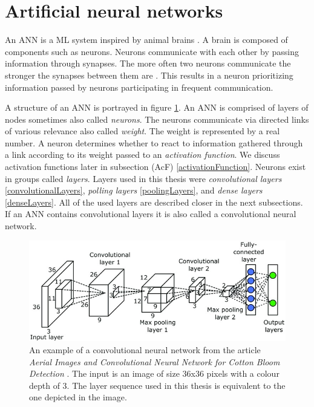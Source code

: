 \section{Artificial neural networks} \label{artificialNeuralNetworks}
An ANN is a ML system inspired by animal brains \cite{machineLeraningApproaches}. A brain is composed of components such as neurons. Neurons communicate with each other by passing information through synapses. The more often two neurons communicate the stronger the synapses between them are \cite{neuronsInBrain}. This results in a neuron prioritizing information passed by neurons participating in frequent communication. 

A structure of an ANN is portrayed in figure \ref{structureOfCNN}. An ANN is comprised of layers of nodes sometimes also called \textit{neurons}. The neurons communicate via directed links of various relevance also called \textit{weight}. The weight is represented by a real number. A neuron determines whether to react to information gathered through a link according to its weight passed to an \textit{activation function}. We discuss activation functions later in subsection (AcF) \ref{activationFunction}. Neurons exist in groups called \textit{layers}. Layers used in this thesis were \textit{convolutional layers} \ref{convolutionalLayers}, \textit{polling layers} \ref{poolingLayers}, and \textit{dense layers} \ref{denseLayers}. All of the used layers are described closer in the next subsections. If an ANN contains convolutional layers it is also called a convolutional neural network.
\begin{figure}[ht!]
  \centering
  \includegraphics[width=\textwidth]{Images/structureOfCNN.png}
  \caption{An example of a convolutional neural network from the article \textit{Aerial Images and Convolutional Neural Network for Cotton Bloom Detection} \cite{structureOfCNN}. The input is an image of size 36x36 pixels with a colour depth of 3. The layer sequence used in this thesis is equivalent to the one depicted in the image.} 
  \label{structureOfCNN}
\end{figure} 


